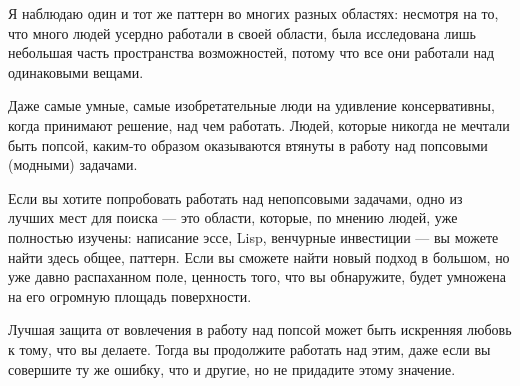 \documentclass[ebook,12pt,oneside,openany]{memoir}
\begin{document}
\maketitle

Я наблюдаю один и тот же паттерн во многих разных областях: несмотря
на то, что много людей усердно работали в своей области, была
исследована лишь небольшая часть пространства возможностей, потому что
все они работали над одинаковыми вещами.

Даже самые умные, самые изобретательные люди на удивление
консервативны, когда принимают решение, над чем работать. Людей,
которые никогда не мечтали быть попсой, каким-то образом оказываются
втянуты в работу над попсовыми (модными) задачами.

Если вы хотите попробовать работать над непопсовыми задачами, одно из
лучших мест для поиска — это области, которые, по мнению людей, уже
полностью изучены: написание эссе, Lisp, венчурные инвестиции — вы
можете найти здесь общее, паттерн. Если вы сможете найти новый подход
в большом, но уже давно распаханном поле, ценность того, что вы
обнаружите, будет умножена на его огромную площадь поверхности.

Лучшая защита от вовлечения в работу над попсой может быть искренняя
любовь к тому, что вы делаете. Тогда вы продолжите работать над этим,
даже если вы совершите ту же ошибку, что и другие, но не придадите
этому значение.
\end{document}
